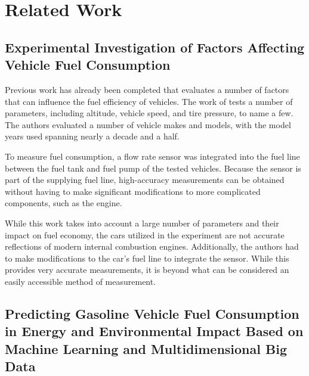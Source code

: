 \documentclass[letterpaper]{article}
\begin{document}
\section{Related Work}



\subsection*{Experimental Investigation of Factors Affecting Vehicle Fuel Consumption}

Previous work has already been completed that evaluates a number of factors that
can influence the fuel efficiency of vehicles. The work of \cite{al2007experimental}
tests a number of parameters, including altitude, vehicle speed, and
tire pressure, to name a few. The authors evaluated a number of vehicle makes
and models, with the model years used spanning nearly a decade and a half. 

To measure fuel consumption, a flow rate sensor was integrated into the fuel line
between the fuel tank and fuel pump of the tested vehicles. Because the sensor
is part of the supplying fuel line, high-accuracy measurements can be obtained
without having to make significant modifications to more complicated components,
such as the engine. 

While this work takes into account a large number of
parameters and their impact on fuel economy, the cars utilized in the experiment
are not accurate reflections of modern internal combustion engines. Additionally, the
authors had to make modifications to the car's fuel line to integrate the sensor.
While this provides very accurate measurements, it is beyond what can be
considered an easily accessible method of measurement.

\subsection*{Predicting Gasoline Vehicle Fuel Consumption in Energy and Environmental 
Impact Based on Machine Learning and Multidimensional Big Data}
\end{document}
